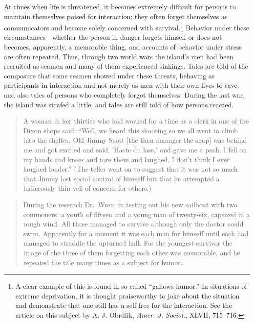 \documentclass[twoside,symmetric,nobib,justified]{tufte-book}
\begin{document}
At times when life is threatened, it becomes extremely difficult for
persons to maintain themselves poised for interaction; they often forget
themselves as communicators and become solely concerned with
survival.\footnote{A clear example of this is found in so-called
  ``gallows humor.'' In situations of extreme deprivation, it is thought
  praiseworthy to joke about the situation and demonstrate that one
  still has a self free for the interaction. See the article on this
  subject by A. J. Obrdlik, \emph{Amer. J. Sociol.}, XLVII, 715--716.}
Behavior under these circumstances---whether the person in danger
forgets himself or does not---becomes, apparently, a memorable thing,
and accounts of behavior under stress are often repeated. Thus, through
two world wars the island's men had been recruited as seamen and many of
them experienced sinkings. Tales are told of the composure that some
seamen showed under these threats, behaving as participants in
interaction and not merely as men with their own lives to save, and also
tales of persons who completely forgot themselves. During the last war,
the island was strafed a little, and tales are still told of how persons
reacted.

\begin{quote}
A woman in her thirties who had worked for a time as a clerk in one of
the Dixon shops said: ``Well, we heard this shooting so we all went to
climb into the shelter. Old Jimmy Scott {[}the then manager the shop{]}
was behind me and got excited and said, 'Haste du lass,' and gave me a
push. I fell on my hands and knees and tore them and laughed. I don't
think I ever laughed louder.'' (The teller went on to suggest that it
was not so much that Jimmy lost social control of himself but that he
attempted a ludicrously thin veil of concern for others.)
\end{quote}

\begin{quote}
During the research Dr.~Wren, in testing out his new sailboat with two
commoners, a youth of fifteen and a young man of twenty-six, capsized in
a rough wind. All three managed to survive although only the doctor
could swim. Apparently for a moment it was each man for himself until
each had managed to straddle the upturned hull. For the youngest
survivor the image of the three of them forgetting each other was
memorable, and he repeated the tale many times as a subject for humor.
\end{quote}
\end{document}
